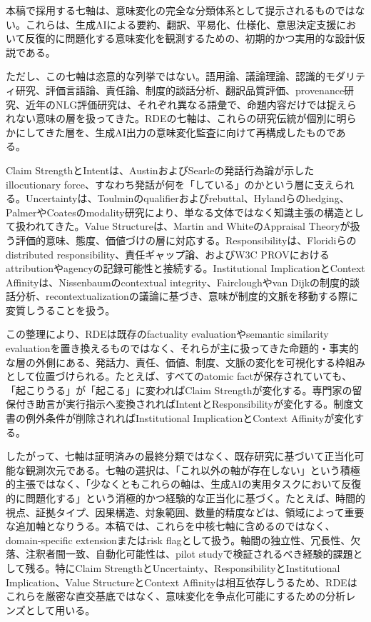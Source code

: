 \documentclass[
  a4paper]{ltjsarticle}
\begin{document}
本稿で採用する七軸は、意味変化の完全な分類体系として提示されるものではない。これらは、生成AIによる要約、翻訳、平易化、仕様化、意思決定支援において反復的に問題化する意味変化を観測するための、初期的かつ実用的な設計仮説である。

ただし、この七軸は恣意的な列挙ではない。語用論、議論理論、認識的モダリティ研究、評価言語論、責任論、制度的談話分析、翻訳品質評価、provenance研究、近年のNLG評価研究は、それぞれ異なる語彙で、命題内容だけでは捉えられない意味の層を扱ってきた。RDEの七軸は、これらの研究伝統が個別に明らかにしてきた層を、生成AI出力の意味変化監査に向けて再構成したものである。

Claim StrengthとIntentは、AustinおよびSearleの発話行為論が示したillocutionary force、すなわち発話が何を「している」のかという層に支えられる\cite{austin1962,searle1969}。Uncertaintyは、Toulminのqualifierおよびrebuttal、Hylandらのhedging、PalmerやCoatesのmodality研究により、単なる文体ではなく知識主張の構造として扱われてきた\cite{toulmin1958,hyland1998,palmer2001,coates1983}。Value Structureは、Martin and WhiteのAppraisal Theoryが扱う評価的意味、態度、価値づけの層に対応する\cite{martinwhite2005}。Responsibilityは、Floridiらのdistributed responsibility、責任ギャップ論、およびW3C PROVにおけるattributionやagencyの記録可能性と接続する\cite{floridi2016,w3cprov2013}。Institutional ImplicationとContext Affinityは、Nissenbaumのcontextual integrity、Faircloughやvan Dijkの制度的談話分析、recontextualizationの議論に基づき、意味が制度的文脈を移動する際に変質しうることを扱う\cite{nissenbaum2009,fairclough1992,vandijk2008}。

この整理により、RDEは既存のfactuality evaluationやsemantic similarity evaluationを置き換えるものではなく、それらが主に扱ってきた命題的・事実的な層の外側にある、発話力、責任、価値、制度、文脈の変化を可視化する枠組みとして位置づけられる。たとえば、すべてのatomic factが保存されていても、「起こりうる」が「起こる」に変わればClaim Strengthが変化する。専門家の留保付き助言が実行指示へ変換されればIntentとResponsibilityが変化する。制度文書の例外条件が削除されればInstitutional ImplicationとContext Affinityが変化する。

したがって、七軸は証明済みの最終分類ではなく、既存研究に基づいて正当化可能な観測次元である。七軸の選択は、「これ以外の軸が存在しない」という積極的主張ではなく、「少なくともこれらの軸は、生成AIの実用タスクにおいて反復的に問題化する」という消極的かつ経験的な正当化に基づく。たとえば、時間的視点、証拠タイプ、因果構造、対象範囲、数量的精度などは、領域によって重要な追加軸となりうる。本稿では、これらを中核七軸に含めるのではなく、domain-specific extensionまたはrisk flagとして扱う。軸間の独立性、冗長性、欠落、注釈者間一致、自動化可能性は、pilot studyで検証されるべき経験的課題として残る。特にClaim StrengthとUncertainty、ResponsibilityとInstitutional Implication、Value StructureとContext Affinityは相互依存しうるため、RDEはこれらを厳密な直交基底ではなく、意味変化を争点化可能にするための分析レンズとして用いる。
\end{document}
